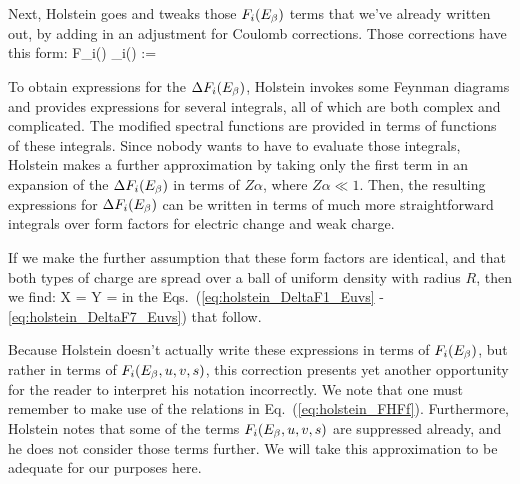 

Next, Holstein goes and tweaks those $F_i(E_{\beta})$ terms that we've already written out, by adding in an adjustment for Coulomb corrections.  Those corrections have this form:
\beq
	F_i(\Ebeta) \rightarrow {}_i(\Ebeta) := \FF {}
\eeq

To obtain expressions for the $\Delta F_i(E_{\beta})$, Holstein invokes some Feynman diagrams and provides expressions for several integrals, all of which are both complex and complicated.  The modified spectral functions are provided in terms of functions of these integrals.  Since nobody wants to have to evaluate those integrals, Holstein makes a further approximation by taking only the first term in an expansion of the $\Delta F_i(E_{\beta})$ in terms of $Z\alpha$, where $Z\alpha \ll 1$.  Then, the resulting expressions for $\Delta F_i(E_{\beta})$ can be written in terms of much more straightforward integrals over form factors for electric change and weak charge.  

If we make the further assumption that these form factors are identical, and that both types of charge are spread over a ball of uniform density with radius $R$, then we find:
\bea
	X = Y = 
\eea
in the Eqs.~(\ref{eq:holstein_DeltaF1_Euvs} - \ref{eq:holstein_DeltaF7_Euvs}) that follow.

Because Holstein doesn't actually write 
these expressions
in terms of $F_i(E_{\beta})$, but rather in terms of $F_i(E_{\beta}, u,v,s)$, this correction presents yet another opportunity for the reader to interpret his notation incorrectly.  We note that one must remember to make use of the relations in Eq.~(\ref{eq:holstein_FHFf}).  Furthermore, Holstein notes that some of the terms $F_i(E_{\beta}, u,v,s)$ are suppressed already, and he does not consider those terms further.  We will take this approximation to be adequate for our purposes here.

